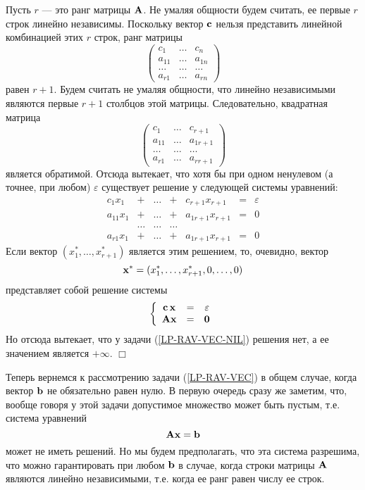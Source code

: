 Пусть $r$ --- это ранг матрицы $\mathbf{A}$. Не умаляя общности будем
считать, ее первые $r$ строк линейно независимы. Поскольку вектор
$\mathbf{c}$ нельзя представить линейной комбинацией этих $r$ строк,
ранг матрицы
\[\left(
\begin{array}{ccc}
  c_{1} & \ldots & c_{n} \\
  a_{11} & \ldots & a_{1n} \\
   \ldots& \ldots &\ldots  \\
  a_{r1} & \ldots & a_{rn}
\end{array}
\right)\] равен $r+1$. Будем считать не умаляя общности, что линейно
независимыми являются первые $r+1$ столбцов этой матрицы.
Следовательно, квадратная матрица
\[\left(
\begin{array}{ccc}
  c_{1} & \ldots & c_{r+1} \\
  a_{11} & \ldots & a_{1r+1} \\
   \ldots& \ldots &\ldots  \\
  a_{r1} & \ldots & a_{rr+1}
\end{array}
\right)\]
    является обратимой. Отсюда вытекает, что хотя бы при одном ненулевом
     (а точнее, при любом) $\varepsilon$  существует
    решение у следующей системы уравнений:
\[\begin{array}{ccccccc}
    c_{1}x_{1}& + & \ldots & + & c_{r+1}x_{r+1} & = & \varepsilon \\
    a_{11}x_{1} & + & \ldots & + & a_{1r+1}x_{r+1} & = & 0 \\
     &  \ldots&\ldots  & \ldots &  &  &  \\
    a_{r1}x_{1} & + & \ldots & + & a_{1r+1}x_{r+1} & = & 0
  \end{array}\]
    Если вектор $(x_{1}^{*},\ldots,x_{r+1}^{*})$ является этим
    решением, то, очевидно, вектор
    \[\mathbf{x^{*}}=(x_{1}^{*},\ldots,x_{r+1}^{*},0,\ldots,0)\]
    представляет собой решение системы
    \[\left\{
    \begin{array}{ccc}
      \mathbf{c}\,\mathbf{x} & = & \varepsilon \\
      \mathbf{A}\mathbf{x} & = & \mathbf{0}
    \end{array}\right. \]
    Но отсюда вытекает, что у задачи (\ref{LP-RAV-VEC-NIL}) решения
    нет, а ее значением является $+\infty$. $\Box$

    Теперь вернемся к рассмотрению задачи (\ref{LP-RAV-VEC}) в общем
    случае, когда вектор $\mathbf{b}$ не обязательно равен нулю. В
    первую очередь сразу же заметим, что, вообще говоря у этой
    задачи допустимое множество может быть пустым, т.е. система
    уравнений
\begin{equation} \label{neodnorodnaya systema}
    \mathbf{A}\mathbf{x}=\mathbf{b}
\end{equation}
    может не иметь решений. Но мы будем предполагать, что эта
    система разрешима, что можно гарантировать при любом $\mathbf{b}$ в случае,
    когда строки матрицы $\mathbf{A}$ являются линейно независимыми, т.е. когда ее ранг
    равен числу ее строк.

